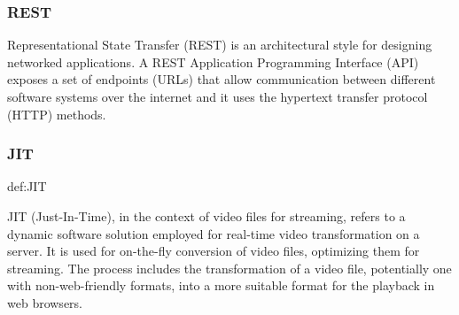 \documentclass[../MasterThesis.tex]{subfiles}
\begin{document}
\subsubsection*{REST} 


Representational State Transfer (REST) is an architectural style for designing networked applications. A REST Application Programming Interface (API) exposes a set of endpoints (URLs) that allow communication between different software systems over the internet and it uses the hypertext transfer protocol (HTTP) methods.~\cite{IEEE_Rest, webservice, Nodejs_Rest}











\subsubsection*{JIT} 
%
\begin{CountingDefinition}[JIT]{def:JIT}
	
	JIT (Just-In-Time), in the context of video files for streaming, refers to a dynamic software solution employed for real-time video transformation on a server. It is used for on-the-fly conversion of video files, optimizing them for streaming. The process includes the transformation of a video file, potentially one with non-web-friendly formats, into a more suitable format for the playback in web browsers.
	
\end{CountingDefinition}






	
	
	
	
\end{document}
